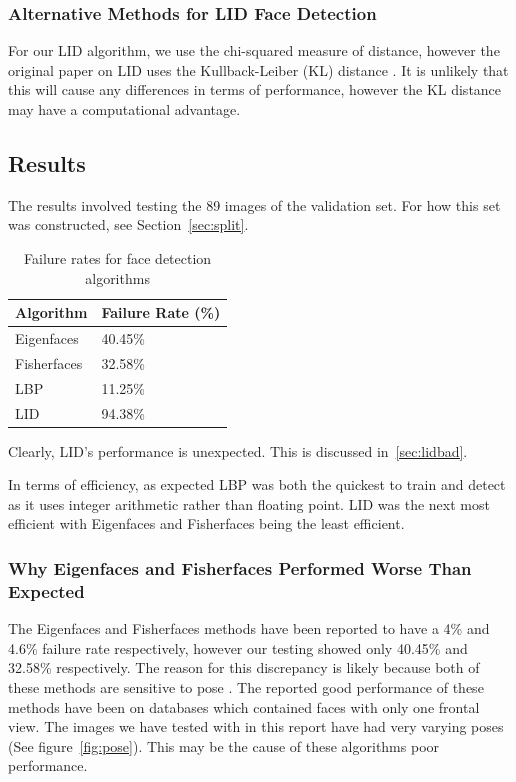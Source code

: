 \documentclass{article}
\begin{document}
\subsubsection{Alternative Methods for LID Face Detection}
\label{sec:alternativeLID}
For our LID algorithm, we use the chi-squared measure of distance, however the original paper on LID uses the Kullback-Leiber (KL) distance \cite{nguyen2011local}. It is unlikely that this will cause any differences in terms of performance, however the KL distance may have a computational advantage.

\subsection{Results}
The results involved testing the 89 images of the validation set. For how this set was constructed, see Section~\ref{sec:split}.
\begin{table}[H]
	\centering
    \begin{tabular}{|l|l|}
    \hline
    Algorithm & Failure Rate (\%) \\
    \hline
    Eigenfaces & 40.45\% \\
    Fisherfaces & 32.58\% \\
    LBP & 11.25\% \\
    LID & 94.38\% \\
    \hline
    \end{tabular}
    \caption {Failure rates for face detection algorithms}
\end{table}

Clearly, LID's performance is unexpected. This is discussed in~\ref{sec:lidbad}.

In terms of efficiency, as expected LBP was both the quickest to train and detect as it uses integer arithmetic rather than floating point. LID was the next most efficient with Eigenfaces and Fisherfaces being the least efficient.


\subsubsection{Why Eigenfaces and Fisherfaces Performed Worse Than Expected}
The Eigenfaces and Fisherfaces methods have been reported to have a 4\%\cite{turk1991eigenfaces} and 4.6\%\cite{belhumeur1997eigenfaces} failure rate respectively, however our testing showed only 40.45\% and 32.58\% respectively. The reason for this discrepancy is likely because both of these methods are sensitive to pose \cite{turk1991eigenfaces}\cite{belhumeur1997eigenfaces}. The reported good performance of these methods have been on databases which contained faces with only one frontal view. The images we have tested with in this report have had very varying poses (See figure~\ref{fig:pose}). This may be the cause of these algorithms poor performance.
\end{document}
